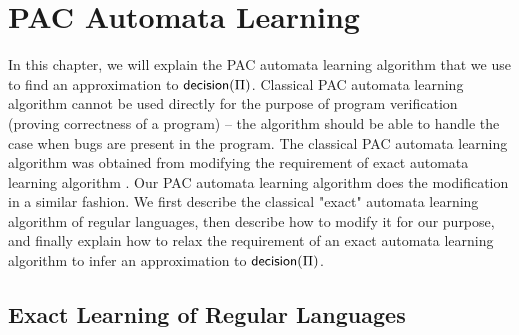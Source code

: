 \chapter{PAC Automata Learning}\label{ch:PAC}

In this chapter, we will explain the PAC automata learning algorithm that we use to find an approximation to $\mathsf{decision}(\Pi)$. Classical PAC automata learning algorithm cannot be used directly for the purpose of program verification (proving correctness of a program) -- the algorithm should be able to handle the case when bugs are present in the program. The classical PAC automata learning algorithm was obtained from modifying the requirement of exact automata learning algorithm \cite{Angluin88}. Our PAC automata learning algorithm does the modification in a similar fashion. We first describe the classical "exact" automata learning algorithm of regular languages, then describe how to modify it for our purpose, and finally explain how to relax the requirement of an exact automata learning algorithm to infer an approximation to $\mathsf{decision}(\Pi)$. 

\section{Exact Learning of Regular Languages}\label{sec:exact}

